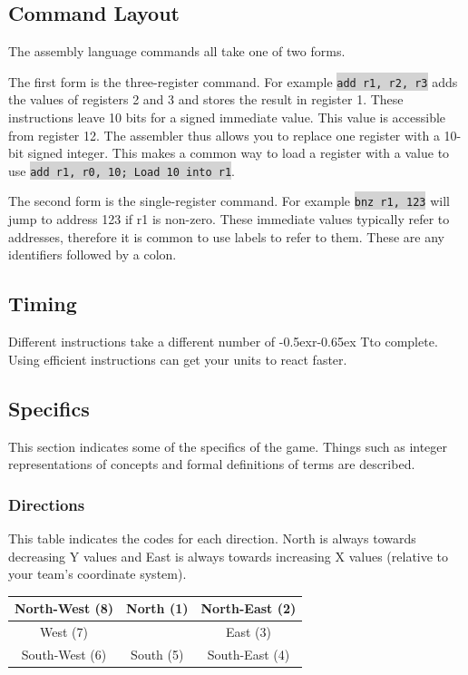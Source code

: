 \documentclass{article}
\newcommand{\vnscode}[1]{\colorbox{lightgray}{\lstinline[language=vns]{#1}}}
\newcommand{\RT}{\lower-0.5ex\hbox{r}\kern-0.65ex T}
\begin{document}
\subsection{Command Layout}

The assembly language commands all take one of two forms.

The first form is the three-register command. For example \vnscode{add r1, r2,
r3} adds the values of registers 2 and 3 and stores the result in register 1.
These instructions leave 10 bits for a signed immediate value. This value is
accessible from register 12.  The assembler thus allows you to replace one
register with a 10-bit signed integer. This makes a common way to load a
register with a value to use \vnscode{add r1, r0, 10; Load 10 into r1}.

The second form is the single-register command. For example \vnscode{bnz r1,
123} will jump to address 123 if r1 is non-zero. These immediate values
typically refer to addresses, therefore it is common to use labels to refer to
them. These are any identifiers followed by a colon.

\subsection{Timing}

Different instructions take a different number of \RT to complete. Using
efficient instructions can get your units to react faster.

\subsection{Specifics}

This section indicates some of the specifics of the game. Things such as integer
representations of concepts and formal definitions of terms are described.

\subsubsection{Directions}

This table indicates the codes for each direction. North is always towards
decreasing Y values and East is always towards increasing X values (relative to
your team's coordinate system).

\begin{minipage}{\textwidth}
\centering
\begin{tabular}{|c|c|c|}
    \hline North-West (8) & North (1) & North-East (2) \\ \hline
    West (7) & & East (3) \\ \hline
    South-West (6) & South (5) & South-East (4) \\ \hline
\end{tabular}
\end{minipage}
\end{document}
